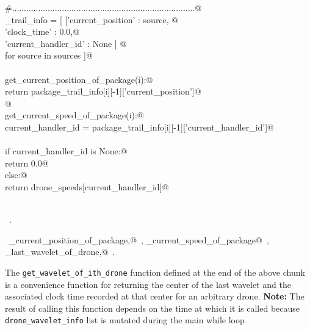 \documentclass[10pt, english, oneside]{report}
\begin{document}
\begin{flushleft}
\begin{minipage}{\linewidth}
\begin{list}{}{}
\mbox{}\verb@#.............................................................................@\\
\mbox{}\verb@package_trail_info  = [ [{'current_position'   : source, @\\
\mbox{}\verb@                          'clock_time'         : 0.0,@\\
\mbox{}\verb@                          'current_handler_id' : None }] @\\
\mbox{}\verb@                        for source in sources ]@\\
\mbox{}\verb@@\\
\mbox{}\verb@def get_current_position_of_package(i):@\\
\mbox{}\verb@         return package_trail_info[i][-1]['current_position']@\\
\mbox{}\verb@    @\\
\mbox{}\verb@def get_current_speed_of_package(i):@\\
\mbox{}\verb@         current_handler_id = package_trail_info[i][-1]['current_handler_id']@\\
\mbox{}\verb@@\\
\mbox{}\verb@         if current_handler_id is None:@\\
\mbox{}\verb@              return 0.0@\\
\mbox{}\verb@         else:@\\
\mbox{}\verb@              return drone_speeds[current_handler_id]@\\
\mbox{}\verb@@\\
\mbox{}\verb@@{\NWsep}
\end{list}
\vspace{-1.5ex}
\footnotesize
\begin{list}{}{\setlength{\itemsep}{-\parsep}\setlength{\itemindent}{-\leftmargin}}
\item \NWtxtMacroRefIn\ .
\item \NWtxtIdentsDefed\nobreak\  \verb@get_current_position_of_package,@\nobreak\ \NWtxtIdentsNotUsed, \verb@get_current_speed_of_package@\nobreak\ , \verb@get_last_wavelet_of_drone,@\nobreak\ \NWtxtIdentsNotUsed.
\item{}
\end{list}
\end{minipage}\vspace{4ex}
\end{flushleft}

 The \verb|get_wavelet_of_ith_drone| function defined at the end of the above chunk is a convenience function 
 for returning the center of the last wavelet and the associated clock time recorded at that center
 for an arbitrary drone.  \textbf{Note:} The result of calling this function depends on the time at which it 
 is called because \verb|drone_wavelet_info| list is mutated during the main while loop
\end{document}
